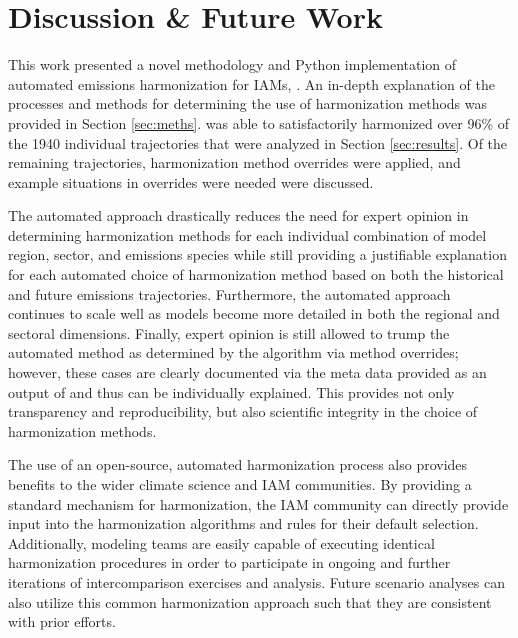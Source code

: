 \section{Discussion \& Future Work}\label{sec:future}

This work presented a novel methodology and Python implementation of automated
emissions harmonization for IAMs, . An in-depth explanation of the
processes and methods for determining the use of harmonization methods was
provided in Section \ref{sec:meths}.  was able to satisfactorily
harmonized over 96\% of the 1940 individual trajectories that were analyzed in
% 
% 
Section \ref{sec:results}. Of the remaining trajectories, harmonization method
overrides were applied, and example situations in overrides were needed
were discussed.

The automated approach drastically reduces the need for expert opinion in
determining harmonization methods for each individual combination of model
region, sector, and emissions species while still providing a justifiable
explanation for each automated choice of harmonization method based on both the
historical and future emissions trajectories. Furthermore, the automated
approach continues to scale well as models become more detailed in both the
regional and sectoral dimensions. Finally, expert opinion is still allowed to
trump the automated method as determined by the algorithm via method overrides;
however, these cases are clearly documented via the meta data provided as an
output of  and thus can be individually explained. This provides
not only transparency and reproducibility, but also scientific integrity in the
choice of harmonization methods.

The use of an open-source, automated harmonization process also provides
benefits to the wider climate science and IAM communities. By providing a
standard mechanism for harmonization, the IAM community can directly provide
input into the harmonization algorithms and rules for their default
selection. Additionally, modeling teams are easily capable of executing
identical harmonization procedures in order to participate in ongoing and
further iterations of intercomparison exercises and analysis. Future scenario
analyses can also utilize this common harmonization approach such that they are
consistent with prior efforts.

